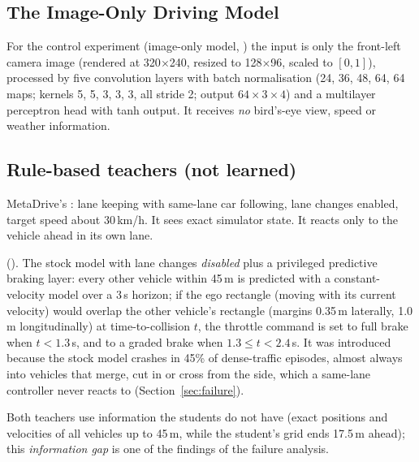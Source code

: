\subsection{The Image-Only Driving Model}
For the control experiment (image-only model, ) the input is only the front-left camera image (rendered at 320$\times$240, resized to 128$\times$96, scaled to $[0,1]$), processed by five convolution layers with batch normalisation (24, 36, 48, 64, 64 maps; kernels 5, 5, 3, 3, 3, all stride 2; output $64\times3\times4$) and a multilayer perceptron head with tanh output.
It receives \emph{no} bird's-eye view, speed or weather information.

\subsection{Rule-based teachers (not learned)}\label{sec:teachers}
\begin{description}[leftmargin=3.4cm,style=nextline]
\item[Stock intelligent driver model] MetaDrive's : lane keeping with same-lane car following, lane changes enabled, target speed about 30\,km/h. It sees exact simulator state. It reacts only to the vehicle ahead in its own lane.
\item[Collision-aware teacher]  (). The stock model with lane changes \emph{disabled} plus a privileged predictive braking layer: every other vehicle within 45\,m is predicted with a constant-velocity model over a 3\,s horizon;
 if the ego rectangle (moving with its current velocity) would overlap the other vehicle's rectangle (margins 0.35\,m laterally, 1.0\,m longitudinally) at time-to-collision $t$, the throttle command is set to full brake when $t<1.3$\,s, and to a graded brake when $1.3\le t<2.4$\,s.
 It was introduced because the stock model crashes in 45\% of dense-traffic episodes, almost always into vehicles that merge, cut in or cross from the side, which a same-lane controller never reacts to (Section~\ref{sec:failure}).
\end{description}
Both teachers use information the students do not have (exact positions and velocities of all vehicles up to 45\,m, while the student's grid ends 17.5\,m ahead); this \emph{information gap} is one of the findings of the failure analysis.
